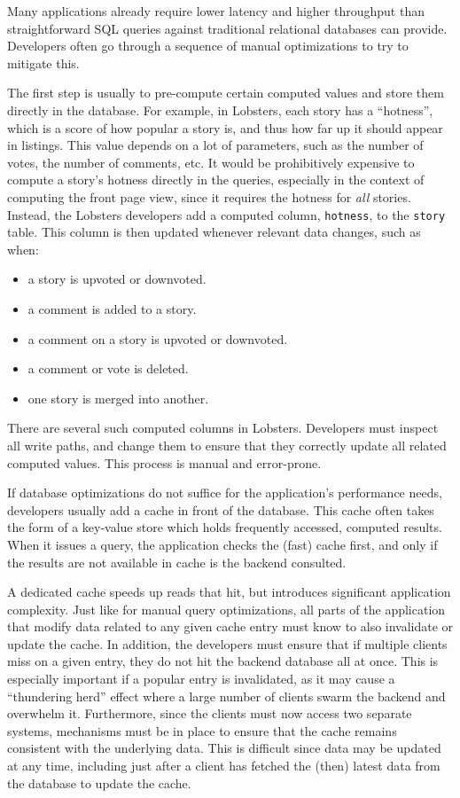Many applications already require lower latency and higher throughput than
straightforward SQL queries against traditional relational databases can
provide. Developers often go through a sequence of manual optimizations to try
to mitigate this.

The first step is usually to pre-compute certain computed values and store them
directly in the database. For example, in Lobsters, each story has a
``hotness'', which is a score of how popular a story is, and thus how far up it
should appear in listings. This value depends on a lot of parameters, such as
the number of votes, the number of comments, etc. It would be prohibitively
expensive to compute a story's hotness directly in the queries,
especially in the context of computing the front page view, since it requires
the hotness for \emph{all} stories. Instead, the Lobsters developers add a
computed column, \texttt{hotness}, to the \texttt{story} table. This column is
then updated whenever relevant data changes, such as when:

\begin{itemize}
    \item a story is upvoted or downvoted.
    \item a comment is added to a story.
    \item a comment on a story is upvoted or downvoted.
    \item a comment or vote is deleted.
    \item one story is merged into another.
\end{itemize}

There are several such computed columns in Lobsters. Developers must inspect all
write paths, and change them to ensure that they correctly update all related
computed values. This process is manual and error-prone.

If database optimizations do not suffice for the application's performance
needs, developers usually add a cache in front of the database. This cache
often takes the form of a key-value store which holds frequently accessed,
computed results. When it issues a query, the application checks the (fast)
cache first, and only if the results are not available in cache is the backend
consulted.

A dedicated cache speeds up reads that hit, but introduces significant
application complexity. Just like for manual query optimizations, all parts of
the application that modify data related to any given cache entry must know to
also invalidate or update the cache. In addition, the developers must ensure
that if multiple clients miss on a given entry, they do not hit the backend
database all at once. This is especially important if a popular entry is
invalidated, as it may cause a ``thundering herd'' effect where a large number
of clients swarm the backend and overwhelm it. Furthermore, since the clients
must now access two separate systems, mechanisms must be in place to ensure that
the cache remains consistent with the underlying data. This is difficult since
data may be updated at any time, including just after a client has fetched the
(then) latest data from the database to update the cache.

